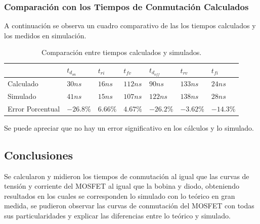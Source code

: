 \subsubsection{Comparación con los Tiempos de Conmutación Calculados}


A continuación se observa un cuadro comparativo de las los tiempos calculados y los medidos en simulación.
\begin{table}[H]
\centering
\begin{tabular}{@{}lllllll@{}}
\toprule
 & $t_{d_{on}}$ & $t_{ri}$ & $t_{fv}$ & $t_{d_{off}}$ & $t_{rv}$ & $t_{fi}$ \\ \midrule
Calculado & $30ns$ & $16ns$ & $112ns$ & $90ns$ & $133ns$ & $24ns$ \\
Simulado & $41ns$ & $15ns$ & $107ns$ & $122ns$ & $138ns$ & $28ns$ \\
Error Porcentual & $-26.8\%$ & $6.66\%$ & $4.67\%$ & $-26.2\%$ & $-3.62\%$ & $-14.3\%$ \\ \bottomrule
\end{tabular}
\caption{Comparación entre tiempos calculados y simulados.}
\end{table}
Se puede apreciar que no hay un error significativo en los cálculos y lo simulado.

\subsection{Conclusiones}
Se calcularon y midieron los tiempos de conmutación al igual que las curvas de tensión y corriente del MOSFET al igual que la bobina y diodo, obteniendo resultados en los cuales se corresponden lo simulado con lo teórico en gran medida, se pudieron observar las curvas de conmutación del MOSFET con todas sus particularidades y explicar las diferencias entre lo teórico y simulado.

